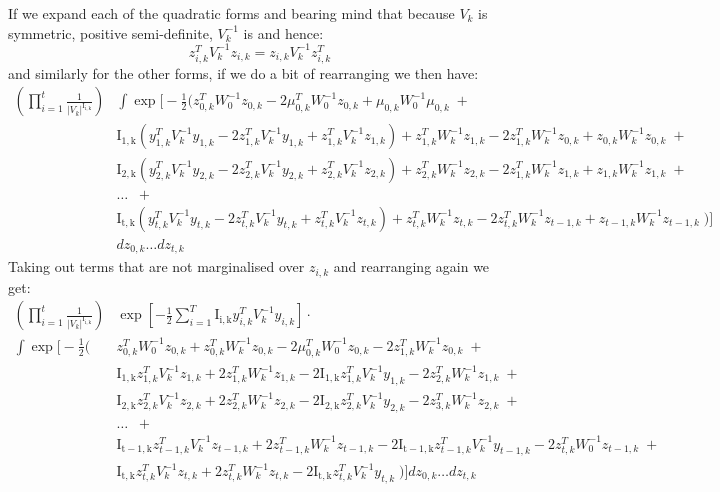 \documentclass{standalone}
\newcommand{\yik}[1]{y_{#1, k}}
\newcommand{\zik}[1]{z_{#1, k}}
\newcommand{\mik}[1]{\mu_{#1, k}}
\newcommand{\vk}{V_k}
\newcommand{\Ik}[1]{\operatorname{I_{#1, k}}}
\newcommand{\ivk}[1]{V_{#1}^{-1}}
\newcommand{\iwk}[1]{W_{#1}^{-1}}
\DeclareMathOperator{\lint}{\displaystyle\int}
\DeclareMathOperator{\lprod}{\displaystyle\prod}
\begin{document}
If we expand each of the quadratic forms and bearing mind that because $\vk$ is symmetric, positive semi-definite, $\ivk{k}$ is and hence:
\begin{equation}
\label{eq:lin1} 
\zik{i}^T \ivk{k} \zik{i} =  \zik{i} \ivk{k} \zik{i}^T 
\end{equation} 
and similarly for the other forms, if we do a bit of rearranging we then have:
\begin{align*}
 \left( \lprod_{i = 1}^t \frac{1}{|\vk|^{\Ik{i}}} \right) & \lint \exp \biggl[-\frac{1}{2} \biggl(
 \zik{0}^T \iwk{0} \zik{0} - 2 \mik{0}^T \iwk{0} \zik{0} + \mik{0} \iwk{0} \mik{0} \; +  \\
 & \Ik{1} \left(\yik{1}^T \ivk{k} \yik{1} -2 \zik{1}^T \ivk{k} \yik{1} + \zik{1}^T \ivk{k} \zik{1} \right) + \zik{1}^T \iwk{k} \zik{1} - 2 \zik{1}^T \iwk{k}
  \zik{0} + \zik{0} \iwk{k} \zik{0}\; + \\
 & \Ik{2} \left(\yik{2}^T \ivk{k} \yik{2} -2 \zik{2}^T \ivk{k} \yik{2} + \zik{2}^T \ivk{k} \zik{2} \right) + \zik{2}^T \iwk{k} \zik{2} - 2 \zik{1}^T \iwk{k}
  \zik{1} + \zik{1} \iwk{k} \zik{1}\; + \\
 & \dots \; \; + \\
 & \Ik{t} \left(\yik{t}^T \ivk{k} \yik{t} -2 \zik{t}^T \ivk{k} \yik{t} + \zik{t}^T \ivk{k} \zik{t} \right) + \zik{t}^T \iwk{k} \zik{t} - 2 \zik{t}^T \iwk{k}
  \zik{t-1} + \zik{t-1} \iwk{k} \zik{t-1}\; \biggr) \biggr] \\
 & d\zik{0} \dots d\zik{t} 
\end{align*}
Taking out terms that are not marginalised over $\zik{i}$ and rearranging again we get:
\begin{align*}
 \left( \lprod_{i = 1}^t \frac{1}{|\vk|^{\Ik{i}}} \right) & \exp \left[-\frac{1}{2} \sum_{i = 1}^T \Ik{i} \yik{i}^T \ivk{k} \yik{i} \right] \cdot \\ 
 \lint \exp \biggl[ -\frac{1}{2} \biggl(
 & \zik{0}^T \iwk{0} \zik{0} + \zik{0}^T \iwk{k} \zik{0} -2 \mik{0}^T \iwk{0} \zik{0} -2 \zik{1}^T \iwk{k} \zik{0}\; +  \\
 & \Ik{1} \zik{1}^T \ivk{k} \zik{1} + 2 \zik{1}^T \iwk{k} \zik{1} -2 \Ik{1} \zik{1}^T \ivk{k} \yik{1} -2 \zik{2}^T \iwk{k} \zik{1}\; +  \\ 
 & \Ik{2} \zik{2}^T \ivk{k} \zik{2} + 2 \zik{2}^T \iwk{k} \zik{2} -2 \Ik{2} \zik{2}^T \ivk{k} \yik{2} -2 \zik{3}^T \iwk{k} \zik{2}\; +  \\ 
 & \dots \; \; + \\
 & \Ik{t-1} \zik{t-1}^T \ivk{k} \zik{t-1} + 2 \zik{t-1}^T \iwk{k} \zik{t-1} -2 \Ik{t-1} \zik{t-1}^T \ivk{k} \yik{t-1} -2 \zik{t}^T \iwk{0} \zik{t-1}\; +  \\ 
 & \Ik{t} \zik{t}^T \ivk{k} \zik{t} + 2 \zik{t}^T \iwk{k} \zik{t} -2 \Ik{t} \zik{t}^T \ivk{k} \yik{t} \; \biggr) \biggr]d\zik{0} \dots d\zik{t}
\end{align*}
\end{document}
